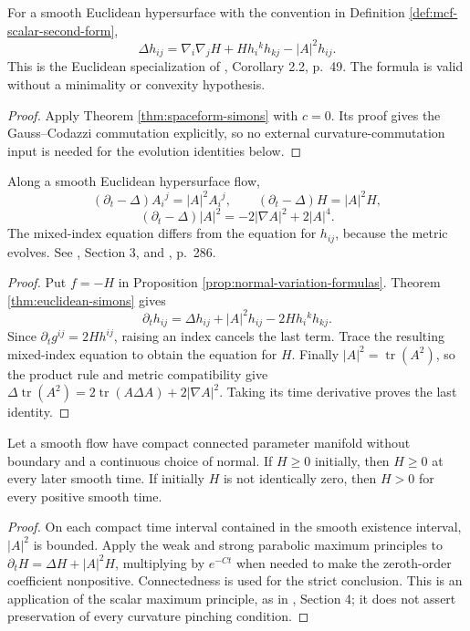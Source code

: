 \begin{theorem}\label{thm:euclidean-simons}
For a smooth Euclidean hypersurface with the convention in Definition \ref{def:mcf-scalar-second-form},
\[
 \Delta h_{ij}=\nabla_i\nabla_jH+Hh_i{}^kh_{kj}-|A|^2h_{ij}.
\]
This is the Euclidean specialization of \cite{HP99}, Corollary 2.2, p.~49. The formula is valid without a minimality or convexity hypothesis.
\end{theorem}
\begin{proof}
Apply Theorem \ref{thm:spaceform-simons} with $c=0$. Its proof gives the Gauss--Codazzi commutation explicitly, so no external curvature-commutation input is needed for the evolution identities below.
\end{proof}

\begin{proposition}\label{prop:mcf-curvature-evolution}
Along a smooth Euclidean hypersurface flow,
\[
 (\partial_t-\Delta)A_i{}^j=|A|^2A_i{}^j,
 \qquad (\partial_t-\Delta)H=|A|^2H,
\]
\[
 (\partial_t-\Delta)|A|^2=-2|\nabla A|^2+2|A|^4.
\]
The mixed-index equation differs from the equation for $h_{ij}$, because the metric evolves. See \cite{HP99}, Section 3, and \cite{Hui90}, p.~286.
\end{proposition}
\begin{proof}
Put $f=-H$ in Proposition \ref{prop:normal-variation-formulas}. Theorem \ref{thm:euclidean-simons} gives
\[
 \partial_th_{ij}=\Delta h_{ij}+|A|^2h_{ij}-2Hh_i{}^kh_{kj}.
\]
Since $\partial_tg^{ij}=2Hh^{ij}$, raising an index cancels the last term. Trace the resulting mixed-index equation to obtain the equation for $H$. Finally $|A|^2=\operatorname{tr}(A^2)$, so the product rule and metric compatibility give
$\Delta\operatorname{tr}(A^2)=2\operatorname{tr}(A\Delta A)+2|\nabla A|^2$.
Taking its time derivative proves the last identity.
\end{proof}

\begin{corollary}\label{cor:mcf-mean-convexity}
Let a smooth flow have compact connected parameter manifold without boundary and a continuous choice of normal. If $H\geq0$ initially, then $H\geq0$ at every later smooth time. If initially $H$ is not identically zero, then $H>0$ for every positive smooth time.
\end{corollary}
\begin{proof}
On each compact time interval contained in the smooth existence interval, $|A|^2$ is bounded. Apply the weak and strong parabolic maximum principles to $\partial_tH=\Delta H+|A|^2H$, multiplying by $e^{-Ct}$ when needed to make the zeroth-order coefficient nonpositive. Connectedness is used for the strict conclusion. This is an application of the scalar maximum principle, as in \cite{Hui90}, Section 4; it does not assert preservation of every curvature pinching condition.
\end{proof}

